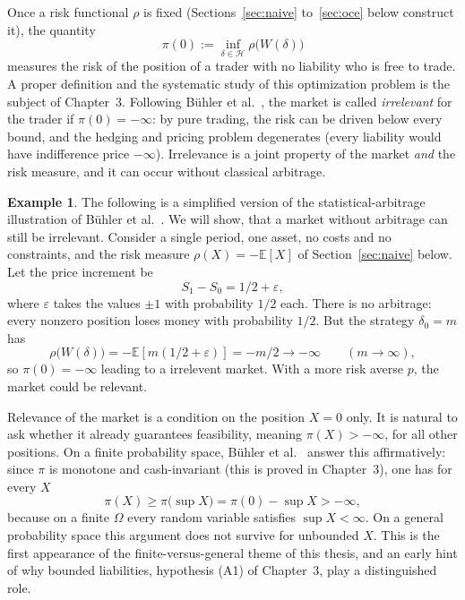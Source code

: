 \documentclass[11pt,a4paper]{report}
\numberwithin{equation}{chapter}
\theoremstyle{plain}
\theoremstyle{definition}
\newtheorem{example}[proposition]{Example}
\newcommand{\E}{\mathbb{E}}
\newcommand{\HH}{\mathcal{H}}
\begin{document}
Once a risk functional $\rho$ is fixed (Sections~\ref{sec:naive} to~\ref{sec:oce} below construct it), the quantity
\[
    \pi(0):=\inf_{\delta\in\HH}\rho\bigl(W(\delta)\bigr)
\]
measures the risk of the position of a trader with no liability who is free to trade. A proper definition and the systematic study of this optimization problem is the subject of Chapter~3. Following B\"uhler et al.\ \cite[Section~3.1]{buehler}, the market is called \emph{irrelevant} for the trader if $\pi(0)=-\infty$: by pure trading, the risk can be driven below every bound, and the hedging and pricing problem degenerates (every liability would have indifference price $-\infty$). Irrelevance is a joint property of the market \emph{and} the risk measure, and it can occur without classical arbitrage.

\begin{example}\label{ex:stat-arb}
    The following is a simplified version of the statistical-arbitrage
    illustration of B\"uhler et al.\ \cite[Section~3.1]{buehler}. We will show, that a market without arbitrage can still be irrelevant. Consider a
    single period, one asset, no costs and no constraints, and the risk
    measure $\rho(X)=-\E[X]$ of Section~\ref{sec:naive} below. Let the
    price increment be
    \[
        S_1-S_0=1/2+\varepsilon,
    \]
    where $\varepsilon$ takes the values $\pm1$ with probability $1/2$ each. There is no arbitrage: every nonzero position loses money with probability $1/2$. But the strategy $\delta_0=m$ has
    \[
        \rho\bigl(W(\delta)\bigr)=-\E[m(1/2+\varepsilon)]=-m/2\longrightarrow-\infty\qquad(m\to\infty),
    \]
    so $\pi(0)=-\infty$ leading to a irrelevent market. With a more risk averse $p$, the market could be relevant.
\end{example}

Relevance of the market is a condition on the position $X=0$ only. It is natural to ask whether it already guarantees feasibility, meaning $\pi(X)>-\infty$, for all other positions. On a finite probability space, B\"uhler et al.\ \cite[Corollary~3.3]{buehler} answer this affirmatively: since $\pi$ is monotone and cash-invariant (this is proved in Chapter~3), one has for every $X$
\[
    \pi(X)\ge\pi\bigl(\sup X\bigr)=\pi(0)-\sup X>-\infty,
\]
because on a finite $\Omega$ every random variable satisfies $\sup X<\infty$. On a general probability space this argument does not survive for unbounded $X$. This is the first appearance of the finite-versus-general theme of this thesis, and an early hint of why bounded liabilities, hypothesis (A1) of Chapter~3, play a distinguished role.
\end{document}
